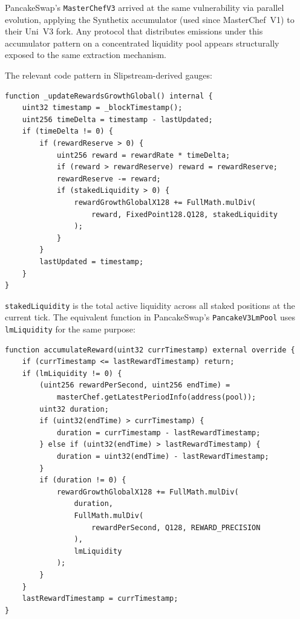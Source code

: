 \documentclass[11pt,a4paper]{article}
\theoremstyle{definition}
\begin{document}
PancakeSwap's \texttt{MasterChefV3} arrived at the same vulnerability via parallel evolution, applying the Synthetix accumulator (used since MasterChef~V1) to their Uni~V3 fork. Any protocol that distributes emissions under this accumulator pattern on a concentrated liquidity pool appears structurally exposed to the same extraction mechanism.

The relevant code pattern in Slipstream-derived gauges:


\begin{center}\begin{minipage}{0.85\textwidth}\begin{verbatim}
function _updateRewardsGrowthGlobal() internal {
    uint32 timestamp = _blockTimestamp();
    uint256 timeDelta = timestamp - lastUpdated;
    if (timeDelta != 0) {
        if (rewardReserve > 0) {
            uint256 reward = rewardRate * timeDelta;
            if (reward > rewardReserve) reward = rewardReserve;
            rewardReserve -= reward;
            if (stakedLiquidity > 0) {
                rewardGrowthGlobalX128 += FullMath.mulDiv(
                    reward, FixedPoint128.Q128, stakedLiquidity
                );
            }
        }
        lastUpdated = timestamp;
    }
}
\end{verbatim}\end{minipage}\end{center}


\texttt{stakedLiquidity} is the total active liquidity across all staked positions at the current tick. The equivalent function in PancakeSwap's \texttt{PancakeV3LmPool} uses \texttt{lmLiquidity} for the same purpose:


\begin{center}\begin{minipage}{0.85\textwidth}\begin{verbatim}
function accumulateReward(uint32 currTimestamp) external override {
    if (currTimestamp <= lastRewardTimestamp) return;
    if (lmLiquidity != 0) {
        (uint256 rewardPerSecond, uint256 endTime) =
            masterChef.getLatestPeriodInfo(address(pool));
        uint32 duration;
        if (uint32(endTime) > currTimestamp) {
            duration = currTimestamp - lastRewardTimestamp;
        } else if (uint32(endTime) > lastRewardTimestamp) {
            duration = uint32(endTime) - lastRewardTimestamp;
        }
        if (duration != 0) {
            rewardGrowthGlobalX128 += FullMath.mulDiv(
                duration,
                FullMath.mulDiv(
                    rewardPerSecond, Q128, REWARD_PRECISION
                ),
                lmLiquidity
            );
        }
    }
    lastRewardTimestamp = currTimestamp;
}
\end{verbatim}\end{minipage}\end{center}
\end{document}
